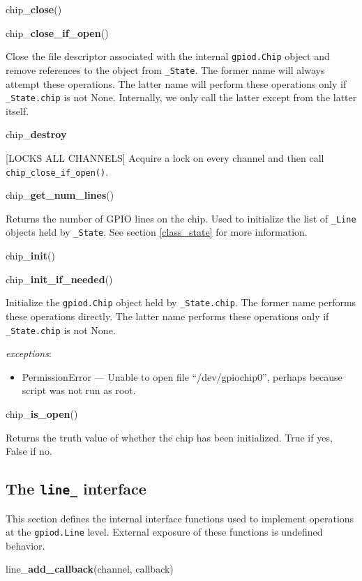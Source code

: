 \documentclass[12pt]{article}
\begin{document}
\noindent chip\_\textbf{close}()

\noindent chip\_\textbf{close\_if\_open}()

Close the file descriptor associated with the internal \texttt{gpiod.Chip} object and remove references to the object from \texttt{\_State}. The former name will always attempt these operations. The latter name will perform these operations only if \texttt{\_State.chip} is not None. Internally, we only call the latter except from the latter itself.

\noindent chip\_\textbf{destroy}

[LOCKS ALL CHANNELS] Acquire a lock on every channel and then call \texttt{chip\_close\_if\_open()}.

\noindent chip\_\textbf{get\_num\_lines}()

Returns the number of GPIO lines on the chip. Used to initialize the list of \texttt{\_Line} objects held by \texttt{\_State}. See section \ref{class_state} for more information.

\noindent chip\_\textbf{init}()

\noindent chip\_\textbf{init\_if\_needed}()

Initialize the \texttt{gpiod.Chip} object held by \texttt{\_State.chip}. The former name performs these operations directly. The latter name performs these operations only if \texttt{\_State.chip} is not None.

\textit{exceptions}:
\begin{itemize}
    \item PermissionError --- Unable to open file ``/dev/gpiochip0'', perhaps because script was not run as root.
\end{itemize}

\noindent chip\_\textbf{is\_open}()

Returns the truth value of whether the chip has been initialized.
True if yes, False if no.

\subsection{The \texttt{line\_} interface}

This section defines the internal interface functions used to implement operations at the \texttt{gpiod.Line} level. External exposure of these functions is undefined behavior.

\medskip

\noindent line\_\textbf{add\_callback}(channel, callback)
\end{document}
